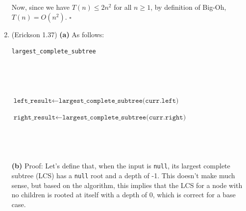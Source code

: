 \documentclass{article}
\begin{document}
\begin{enumerate}
    Now, since we have $T(n) \le 2n^2$ for all $n \ge 1$, by definition of Big-Oh, $T(n) = O(n^2)$. $\square$

    \pagebreak

  \item (Erickson 1.37) \textbf{(a)} As follows:
    \begin{center}
      \begin{minipage}{0.875\linewidth}
        \begin{algorithm}[H]
          \caption{\tt largest\_complete\_subtree}

          \texttt{\\}

          {
          }

          \texttt{\\}

          $\texttt{left\_result} \gets \texttt{largest\_complete\_subtree(curr.left)}$

          $\texttt{right\_result} \gets \texttt{largest\_complete\_subtree(curr.right)}$

          \texttt{\\}

          {
            {
            }
            \Else
            {
            }
          }

          \texttt{\\}

          {
          }
          \Else
          {
          }
        \end{algorithm}
      \end{minipage}
    \end{center}

    \textbf{(b)} Proof: Let's define that, when the input is \texttt{null}, its largest complete subtree (LCS) has a \texttt{null} root and a depth of -1. This doesn't make much sense, but based on the algorithm, this implies that the LCS for a node with no children is rooted at itself with a depth of 0, which is correct for a base case.


\end{enumerate}
\end{document}
